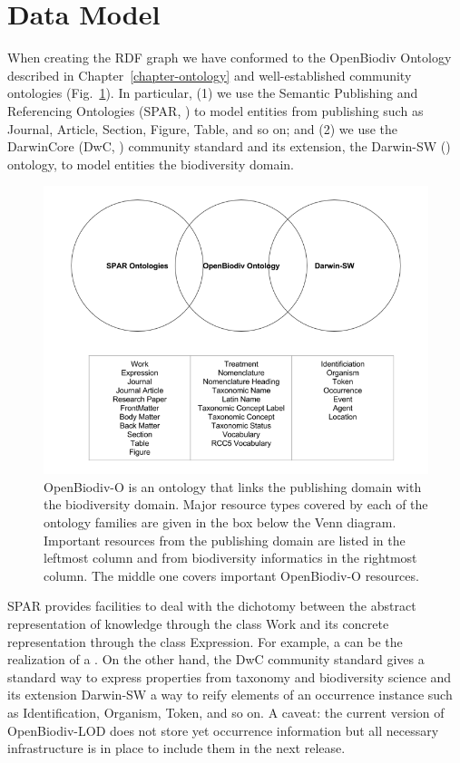\section{Data Model}

When creating the RDF graph we have conformed to the OpenBiodiv Ontology described in Chapter~\ref{chapter-ontology} and well-established community ontologies (Fig.~\ref{fig:community-ontologies}). In particular, (1) we use the Semantic Publishing and Referencing Ontologies (SPAR, \cite{peroni_semantic_2014}) to model entities from publishing such as Journal, Article, Section, Figure, Table, and so on; and (2) we use the DarwinCore (DwC, \cite{wieczorek_darwin_2012}) community standard and its extension, the Darwin-SW (\cite{baskauf_darwin-sw:_2016}) ontology, to model entities the biodiversity domain.

\begin{figure}
\centering
\includegraphics[width=\textwidth]{Figures/community-ontologies}
\decoRule
\caption[Overlap of OpenBiodiv-O with Community Ontologies]{OpenBiodiv-O is an ontology that links the publishing domain with the biodiversity domain. Major resource types covered by each of the ontology families are given in the box below the Venn diagram. Important resources from the publishing domain are listed in the leftmost column and from biodiversity informatics in the rightmost column. The middle one covers important OpenBiodiv-O resources.}
\label{fig:community-ontologies}
\end{figure}

SPAR provides facilities to deal with the dichotomy between the abstract representation of knowledge through the class Work and its concrete representation through the class Expression. For example, a  can be the realization of a . On the other hand, the DwC community standard gives a standard way to express properties from taxonomy and biodiversity science and its extension Darwin-SW a way to reify elements of an occurrence instance such as Identification, Organism, Token, and so on. A caveat: the current version of OpenBiodiv-LOD does not store yet occurrence information but all necessary infrastructure is in place to include them in the next release.

